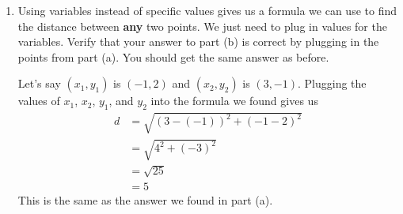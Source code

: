 \documentclass{article}
\begin{document}
\begin{enumerate}
\begin{enumerate}
\begin{problem}
    \end{problem}

    \begin{solution}
        The length of the horizontal side of the triangle is $x_2-x_1$, and the length of the vertical side of the triangle is $y_2-y_1$.
        We can use the Pythagorean theorem to solve for the length of the hypotenuse $d$.
        \begin{align*}
            d^2 &= (x_2-x_1)^2 + (y_2-y_1)^2  \\
            d &= \sqrt{(x_2-x_1)^2 + (y_2-y_1)^2} \text{ (since $d$ must be positive)}
        \end{align*}
    \end{solution}

    \item 
    \begin{problem}
        Using variables instead of specific values gives us a formula we can use to find the distance between \textbf{any} two points. We just need to plug in values for the variables. Verify that your answer to part (b) is correct by plugging in the points from part (a). You should get the same answer as before.
    \end{problem}
    \pspace{\vfill}

    \begin{solution}
        Let's say $(x_1, y_1)$ is $(-1, 2)$ and $(x_2, y_2)$ is $(3, -1)$. Plugging the values of $x_1$, $x_2$, $y_1$, and $y_2$ into the formula we found gives us
        \begin{align*}
            d &= \sqrt{(3-(-1))^2+(-1-2)^2} \\
            &= \sqrt{4^2+(-3)^2} \\
            &= \sqrt{25}\\
            &= 5
        \end{align*}
        This is the same as the answer we found in part (a).
    \end{solution}
\end{enumerate}


\end{enumerate}
\end{document}
